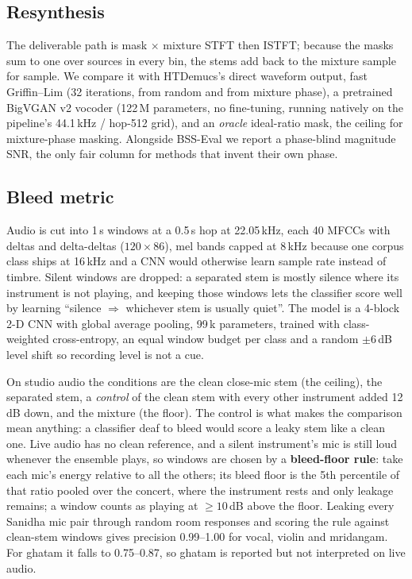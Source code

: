 \documentclass[11pt,a4paper,twocolumn]{article}
\begin{document}
\subsection{Resynthesis}
The deliverable path is mask $\times$ mixture STFT then ISTFT; because the masks sum to one over
sources in every bin, the stems add back to the mixture sample for sample. We compare it with
HTDemucs's direct waveform output, fast Griffin--Lim (32 iterations, from random and from mixture
phase), a pretrained BigVGAN v2 vocoder (122\,M parameters, no fine-tuning, running natively on
the pipeline's 44.1\,kHz / hop-512 grid), and an \emph{oracle} ideal-ratio mask, the ceiling for
mixture-phase masking. Alongside BSS-Eval we report a phase-blind magnitude SNR, the only fair
column for methods that invent their own phase.

\subsection{Bleed metric}
Audio is cut into 1\,s windows at a 0.5\,s hop at 22.05\,kHz, each 40 MFCCs with deltas and
delta-deltas ($120\times86$), mel bands capped at 8\,kHz because one corpus class ships at
16\,kHz and a CNN would otherwise learn sample rate instead of timbre. Silent windows are
dropped: a separated stem is mostly silence where its instrument is not playing, and keeping
those windows lets the classifier score well by learning ``silence $\Rightarrow$ whichever stem
is usually quiet''. The model is a 4-block 2-D CNN with global average pooling, 99\,k parameters,
trained with class-weighted cross-entropy, an equal window budget per class and a random
$\pm6$\,dB level shift so recording level is not a cue.

On studio audio the conditions are the clean close-mic stem (the ceiling), the separated stem, a
\emph{control} of the clean stem with every other instrument added 12\,dB down, and the mixture
(the floor). The control is what makes the comparison mean anything: a classifier deaf to bleed
would score a leaky stem like a clean one. Live audio has no clean reference, and a silent
instrument's mic is still loud whenever the ensemble plays, so windows are chosen by a
\textbf{bleed-floor rule}: take each mic's energy relative to all the others; its bleed floor is
the 5th percentile of that ratio pooled over the concert, where the instrument rests and only
leakage remains; a window counts as playing at $\geq10$\,dB above the floor. Leaking every
Sanidha mic pair through random room responses and scoring the rule against clean-stem windows
gives precision 0.99--1.00 for vocal, violin and mridangam. For ghatam it falls to 0.75--0.87, so
ghatam is reported but not interpreted on live audio.
\end{document}
